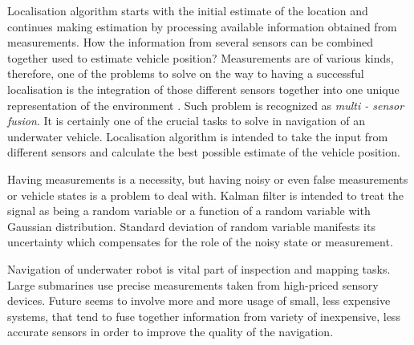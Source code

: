  Localisation algorithm starts with the initial estimate of the location and continues making estimation by processing available information obtained from measurements. How the information from several sensors can be combined together used to estimate vehicle position? Measurements are of various kinds, therefore, one of the problems to solve on the way to having a successful localisation is the integration of those different sensors together into one unique representation of the environment \cite{negenborn03}. Such problem is recognized as \textit{multi - sensor fusion}. It is certainly one of the crucial tasks to solve in navigation of an underwater vehicle. Localisation algorithm is intended to take the input from different sensors and calculate the best possible estimate of the vehicle position. 

Having measurements is a necessity, but having noisy or even false measurements or vehicle states is a problem to deal with. Kalman filter is intended to treat the signal as being a random variable or a function of a random variable with Gaussian distribution. Standard deviation of random variable manifests its uncertainty which compensates for the role of the noisy state or measurement.

Navigation of underwater robot is vital part of inspection and mapping tasks. Large submarines use precise measurements taken from high-priced sensory devices. Future seems to involve more and more usage of small, less expensive systems, that tend to fuse together information from variety of inexpensive, less accurate sensors in order to improve the quality of the navigation. 